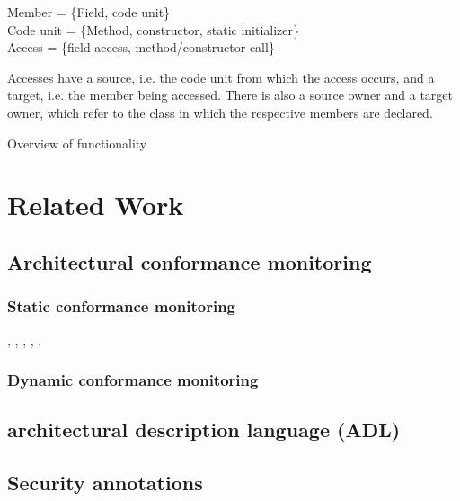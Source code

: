 Member = \{Field, code unit\}\\
Code unit = \{Method, constructor, static initializer\}\\
Access = \{field access, method/constructor call\}

Accesses have a source, i.e. the code unit from which the access occurs, and a target, i.e. the member being accessed. There is also a source owner and a target owner, which refer to the class in which the respective members are declared.

Overview of functionality

\section{Related Work}

\subsection{Architectural conformance monitoring}

\subsubsection{Static conformance monitoring}
\cite{aldrich_archjava_2002}, \cite{abi-antoun_analyzing_2010}, \cite{luckham_event-based_1995}, \cite{abi-antoun_static_2009}, \cite{de_silva_controlling_2012}, \cite{knodel_comparison_2007} 

\subsubsection{Dynamic conformance monitoring}

\subsection{architectural description language (ADL)}

\subsection{Security annotations}



